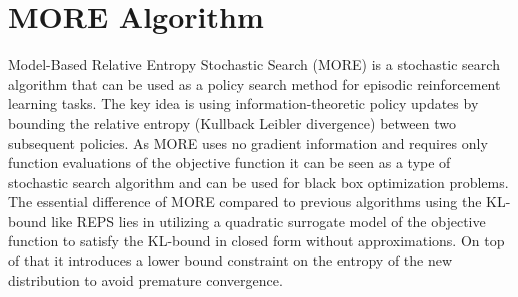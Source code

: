 %
%
%
%
%
%

\section{MORE Algorithm}
\label{sec:more}
Model-Based Relative Entropy Stochastic Search
(MORE) \citep{abdolmaleki2015model} is a
stochastic search algorithm that can be used
as a policy search method for episodic reinforcement
learning tasks. The key idea is
using information-theoretic policy updates
by bounding the relative entropy (Kullback Leibler divergence)
between two subsequent policies.
As MORE uses no gradient information and requires only function evaluations
of the objective function it can be seen as
a type of stochastic search algorithm and can be used
for black box optimization problems.
The essential difference of MORE compared to previous algorithms using
the KL-bound like REPS \citep{peters2010relative} lies in utilizing
a quadratic surrogate model of the objective function
to  satisfy the KL-bound in closed form without approximations.
On top of that it
introduces a lower bound constraint on the entropy of the new distribution
to avoid premature convergence.

